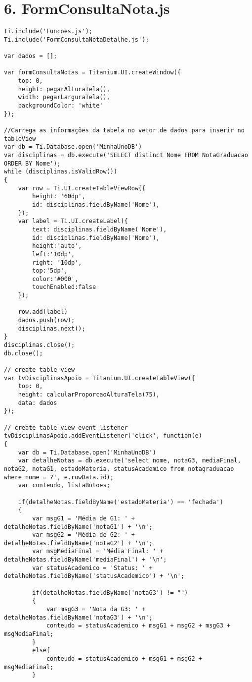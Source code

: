 \section*{6. FormConsultaNota.js}
\begin{lstlisting}
Ti.include('Funcoes.js');
Ti.include('FormConsultaNotaDetalhe.js');

var dados = [];

var formConsultaNotas = Titanium.UI.createWindow({
	top: 0,
	height: pegarAlturaTela(),
	width: pegarLarguraTela(),
	backgroundColor: 'white'
});

//Carrega as informações da tabela no vetor de dados para inserir no tableView
var db = Ti.Database.open('MinhaUnoDB')
var disciplinas = db.execute('SELECT distinct Nome FROM NotaGraduacao ORDER BY Nome');
while (disciplinas.isValidRow())
{
	var row = Ti.UI.createTableViewRow({
		height: '60dp',
		id: disciplinas.fieldByName('Nome'),
	});
	var label = Ti.UI.createLabel({
		text: disciplinas.fieldByName('Nome'),
		id: disciplinas.fieldByName('Nome'),
		height:'auto',
		left:'10dp',
		right: '10dp',
		top:'5dp',
		color:'#000',
		touchEnabled:false
	});
	
	row.add(label)
	dados.push(row);
	disciplinas.next();
}
disciplinas.close();
db.close();

// create table view
var tvDisciplinasApoio = Titanium.UI.createTableView({
	top: 0,
	height: calcularProporcaoAlturaTela(75),
	data: dados
});
 
// create table view event listener
tvDisciplinasApoio.addEventListener('click', function(e)
{
	var db = Ti.Database.open('MinhaUnoDB')
	var detalheNotas = db.execute('select nome, notaG3, mediaFinal, notaG2, notaG1, estadoMateria, statusAcademico from notagraduacao where nome = ?', e.rowData.id);
	var conteudo, listaBotoes;
	
	if(detalheNotas.fieldByName('estadoMateria') == 'fechada')
	{
		var msgG1 = 'Média de G1: ' + detalheNotas.fieldByName('notaG1') + '\n';
		var msgG2 = 'Média de G2: ' + detalheNotas.fieldByName('notaG2') + '\n';
		var msgMediaFinal = 'Média Final: ' + detalheNotas.fieldByName('mediaFinal') + '\n';
		var statusAcademico = 'Status: ' + detalheNotas.fieldByName('statusAcademico') + '\n';
		
		if(detalheNotas.fieldByName('notaG3') != "")
		{
			var msgG3 = 'Nota da G3: ' + detalheNotas.fieldByName('notaG3') + '\n';
			conteudo = statusAcademico + msgG1 + msgG2 + msgG3 + msgMediaFinal;
		}
		else{
			conteudo = statusAcademico + msgG1 + msgG2 + msgMediaFinal;
		}
		

\end{lstlisting}
